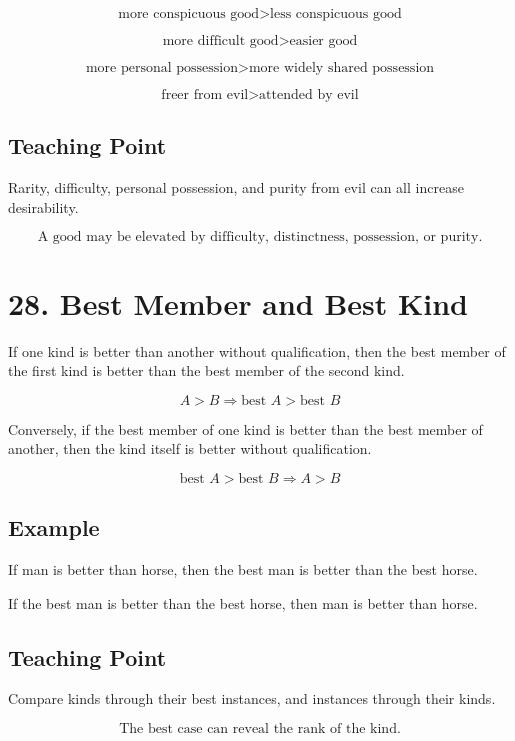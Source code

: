 \documentclass[12pt]{article}
\begin{document}
\[
\text{more conspicuous good} > \text{less conspicuous good}
\]

\[
\text{more difficult good} > \text{easier good}
\]

\[
\text{more personal possession} > \text{more widely shared possession}
\]

\[
\text{freer from evil} > \text{attended by evil}
\]

\subsection*{Teaching Point}

Rarity, difficulty, personal possession, and purity from evil can all increase
desirability.

\[
\boxed{
\text{A good may be elevated by difficulty, distinctness, possession, or purity.}
}
\]

\section*{28. Best Member and Best Kind}

If one kind is better than another without qualification, then the best member
of the first kind is better than the best member of the second kind.

\[
A > B \Rightarrow \text{best } A > \text{best } B
\]

Conversely, if the best member of one kind is better than the best member of
another, then the kind itself is better without qualification.

\[
\text{best } A > \text{best } B \Rightarrow A > B
\]

\subsection*{Example}

If man is better than horse, then the best man is better than the best horse.

If the best man is better than the best horse, then man is better than horse.

\subsection*{Teaching Point}

Compare kinds through their best instances, and instances through their kinds.

\[
\boxed{
\text{The best case can reveal the rank of the kind.}
}
\]
\end{document}
